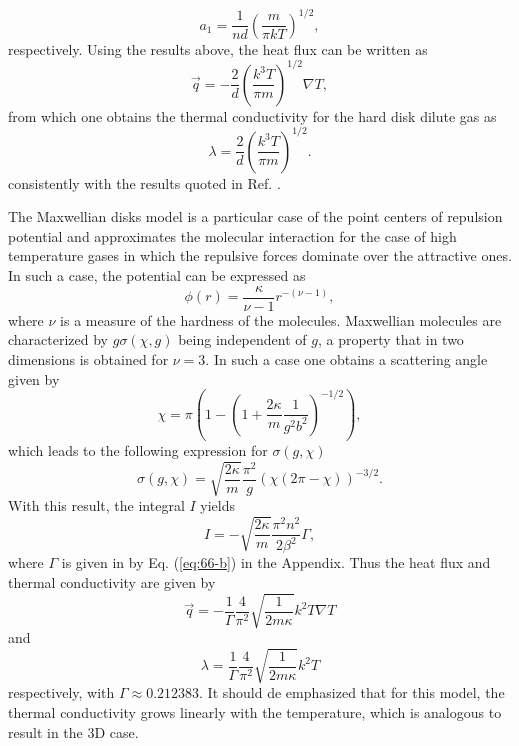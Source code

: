 \documentclass[11pt]{article} %
\begin{document}
\begin{equation}
a_{1}=\frac{1}{nd}\left(\frac{m}{\pi kT}\right)^{1/2},
\end{equation}
respectively.
Using the results above, the heat flux can be written as 
\begin{equation}
\vec{q}=-\frac{2}{d}\left(\frac{k^{3}T}{\pi m}\right)^{1/2}\nabla T,
\end{equation}
from which one obtains the thermal conductivity for the hard disk dilute
gas as
\begin{equation}
\lambda=\frac{2}{d}\left(\frac{k^{3}T}{\pi m}\right)^{1/2}.\label{43}
\end{equation}
consistently with the results quoted in Ref. \cite{Sengers}.

The Maxwellian disks model is a particular case of the point centers
of repulsion potential and approximates the molecular interaction
for the case of high temperature gases in which the repulsive forces
dominate over the attractive ones. In such a case, the potential can
be expressed as \cite{Hirshfelder} 
\begin{equation}
\phi\left(r\right)=\frac{\kappa}{\nu-1} r^{-(\nu-1)},
\end{equation}
where $\nu$ is a measure of the hardness of the molecules. Maxwellian
molecules are characterized by $g\sigma\left(\chi,g\right)$ being
independent of $g$, a property that in two dimensions is obtained
for $\nu=3$. In such a case one obtains a scattering angle given
by 
\begin{equation}
\chi=\pi\left(1-\left(1+\frac{2\kappa}{m}\frac{1}{g^{2}b^{2}}\right)^{-1/2}\right),\label{43.1}
\end{equation}
which leads to the following expression for $\sigma(g,\chi)$
\begin{equation}
\sigma\left(g,\chi\right)=\sqrt{\frac{2\kappa}{m}}\frac{\pi^{2}}{g}\left(\chi\left(2\pi-\chi\right)\right)^{-3/2}.\label{43.2}
\end{equation}
With this result, the integral $I$ yields 
\begin{equation}
I=-\sqrt{\frac{2\kappa}{m}}\frac{\pi^{2}n^{2}}{2\beta^{2}}\Gamma,
\end{equation}
where $\Gamma$ is given in by Eq. (\ref{eq:66-b}) in the Appendix.
Thus the heat flux and thermal conductivity are given by 
\begin{equation}
\vec{q}=-\frac{1}{\Gamma}\frac{4}{\pi^2}\sqrt{\frac{1}{2m\kappa}}k^{2}T\nabla T\label{eq:67-b}
\end{equation}
and 
\begin{equation}
\lambda=\frac{1}{\Gamma}\frac{4}{\pi^{2}}\sqrt{\frac{1}{2m\kappa}}k^{2}T
\end{equation}
respectively, with $\Gamma\approx0.212383$. It should de emphasized
that for this model, the thermal conductivity grows linearly with
the temperature, which is analogous to result in the 3D case.
\end{document}
